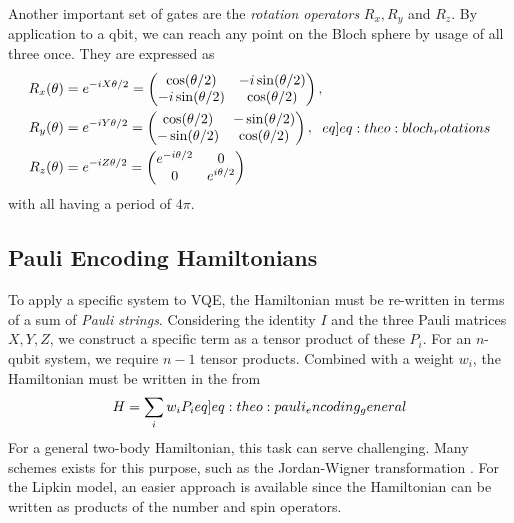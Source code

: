 Another important set of gates are the \textit{rotation operators} $R_x, R_y$ and $R_z$. By application to a qbit, we can reach any point on the Bloch sphere by usage of all three once. They are expressed as
\begin{align}
    \begin{split}
        R_x(\theta) &= \exp{-iX\theta/2} = \begin{pmatrix}
            \cos(\theta/2) & -i\sin(\theta/2) \\
            -i\sin(\theta/2) & \cos(\theta/2)
        \end{pmatrix}, \\
        R_y(\theta) &= \exp{-iY\theta/2} = \begin{pmatrix}
            \cos(\theta/2) & -\sin(\theta/2) \\
            -\sin(\theta/2) & \cos(\theta/2)
        \end{pmatrix}, \\
        R_z(\theta) &= \exp{-iZ\theta/2} = \begin{pmatrix}
            \exp{-i\theta/2} & 0 \\
            0 & \exp{i\theta/2}
        \end{pmatrix}
    \end{split}\label[eq]{eq:theo:bloch_rotations}
\end{align}
with all having a period of $4\pi$.

\subsection{Pauli Encoding Hamiltonians}
To apply a specific system to VQE, the Hamiltonian must be re-written in terms of a sum of \textit{Pauli strings}. Considering the identity $I$ and the three Pauli matrices $X, Y, Z$, we construct a specific term as a tensor product of these $P_i$. For an $n$-qubit system, we require $n-1$ tensor products. Combined with a weight $w_i$, the Hamiltonian must be written in the from
\begin{align}
    H = \sum_i w_i P_i \label[eq]{eq:theo:pauli_encoding_general}
\end{align}
For a general two-body Hamiltonian, this task can serve challenging. Many schemes exists for this purpose, such as the Jordan-Wigner transformation \citep{steudtnerMethodsSimulateFermions2019}. For the Lipkin model, an easier approach is available since the Hamiltonian can be written as products of the number and spin operators.


